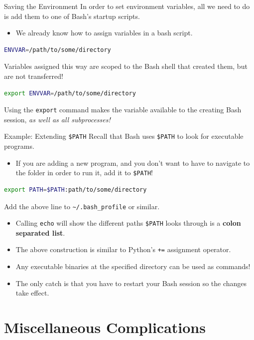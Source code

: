 \documentclass[11pt]{beamer}
\begin{document}
\begin{frame}[fragile=singleslide]{Saving the Environment}
In order to set environment variables, all we need to do is add them to one of Bash's startup scripts.
\begin{itemize}
\item We already know how to assign variables in a bash script.
\end{itemize}
\begin{lstlisting}[style=terminal, language=bash]
ENVVAR=/path/to/some/directory
\end{lstlisting}
Variables assigned this way are scoped to the Bash shell that created them, but are not transferred! 
\begin{lstlisting}[style=terminal, language=bash]
export ENVVAR=/path/to/some/directory
\end{lstlisting}
Using the \texttt{export} command makes the variable available to the creating Bash session, \emph{as well as all subprocesses!}
\end{frame}

\begin{frame}[fragile=singleslide]{Example: Extending \texttt{\$PATH}}
Recall that Bash uses \texttt{\$PATH} to look for executable programs.  
\begin{itemize}
\item If you are adding a new program, and you don't want to have to navigate to the folder in order to run it, add it to \texttt{\$PATH}!
\end{itemize}
\begin{lstlisting}[style=terminal, language=bash]
export PATH=$PATH:path/to/some/directory
\end{lstlisting}
Add the above line to \texttt{\textasciitilde/.bash\_profile} or similar. 
\begin{itemize}
\item Calling \texttt{echo} will show the different paths \texttt{\$PATH} looks through is a \textbf{colon separated list}.  
\item The above construction is similar to Python's \texttt{+=} assignment operator.
\item Any executable binaries at the specified directory can be used as commands! 
\item The only catch is that you have to restart your Bash session so the changes take effect.  
\end{itemize}
\end{frame}

\section[Miscellany]{Miscellaneous Complications}
\end{document}
